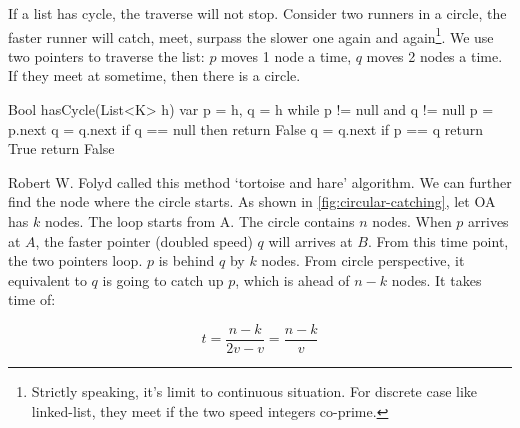 \documentclass[b5paper]{article}
\begin{document}
\begin{Answer}[ref = {ex:list-others}]
{\begin{center}
\label{fig:circular-list}
\end{center}

If a list has cycle, the traverse will not stop. Consider two runners in a circle, the faster runner will catch, meet, surpass the slower one again and again\footnote{Strictly speaking, it's limit to continuous situation. For discrete case like linked-list, they meet if the two speed integers co-prime.}. We use two pointers to traverse the list: $p$ moves 1 node a time, $q$ moves 2 nodes a time. If they meet at sometime, then there is a circle.

\begin{Bourbaki}
Bool hasCycle(List<K> h) {
    var p = h, q = h
    while p != null and q != null {
        p = p.next
        q = q.next
        if q == null then return False
        q = q.next
        if p == q return True
    }
    return False
}
\end{Bourbaki}

Robert W. Folyd called this method `tortoise and hare' algorithm. We can further find the node where the circle starts. As shown in \cref{fig:circular-catching}, let OA has $k$ nodes. The loop starts from A. The circle contains $n$ nodes. When $p$ arrives at $A$, the faster pointer (doubled speed) $q$ will arrives at $B$. From this time point, the two pointers loop. $p$ is behind $q$ by $k$ nodes. From circle perspective, it equivalent to $q$ is going to catch up $p$, which is ahead of $n - k$ nodes. It takes time of:

\[
 t = \dfrac{n - k}{2v - v} = \dfrac{n - k}{v}
\]

\begin{center}
\end{center}}
\end{Answer}
\end{document}
